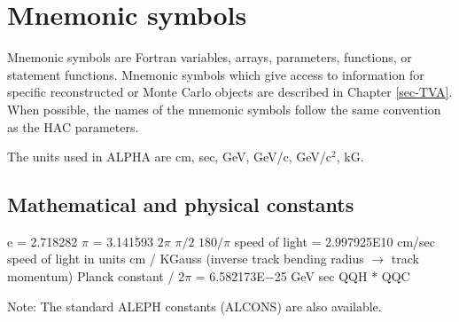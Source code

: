 \chapter{\label{sec-M}Mnemonic symbols}
\par
Mnemonic symbols are Fortran variables, arrays, parameters, functions,
or
statement functions.
Mnemonic symbols which
give access to information for specific reconstructed or Monte Carlo
objects are described in Chapter \ref{sec-TVA}.
When possible, the names of the mnemonic symbols
follow the same convention as the HAC parameters.
 
The units used in ALPHA are  cm, sec, GeV, GeV/c, GeV/c$^2$, kG.
 
\section{\label{sec-MCP}Mathematical and physical constants}
\par
\begin{indentlist}{ 2.50cm}{ 2.75cm}
e = 2.718282
$\pi$ = 3.141593
$2\pi$
$\pi/2$
$180/\pi$
speed of light = 2.997925E10 cm/sec
speed of light in units cm / KGauss
(inverse track bending radius $\rightarrow$ track momentum)
Planck constant / 2$\pi$ = 6.582173E$-$25 GeV sec
QQH * QQC
\end{indentlist}
Note: The standard ALEPH constants (ALCONS) are also available.
